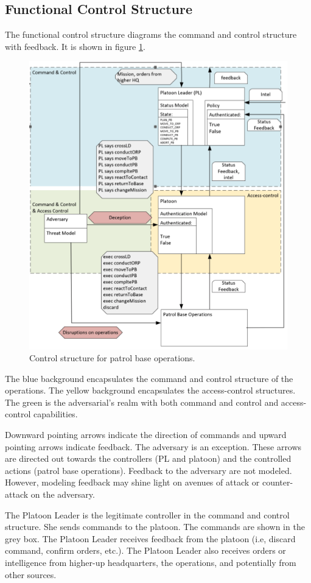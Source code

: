 \documentclass[../../main/main.tex]{subfiles}
\begin{document}
\subsection{Functional Control Structure}
The functional control structure diagrams the command and control structure with feedback.  It is shown in figure \ref{controlstr1}.
\begin{figure}[ht!]
\begin{center}
\includegraphics[width=0.7\linewidth]{../figures/controlstr1}
\caption{Control structure for patrol base operations.}
\label{controlstr1}
\end{center}
\end{figure}
 
The blue background encapsulates the command and control structure of the operations.  The yellow background encapsulates the access-control structures.  The green is the adversarial's realm with both command and control and access-control capabilities.  
 
Downward pointing arrows indicate the direction of commands and upward pointing arrows indicate feedback.  The adversary is an exception. These arrows are directed out towards the controllers (PL and platoon) and the controlled actions (patrol base operations).  Feedback to the adversary are not modeled.  However, modeling feedback may shine light on avenues of attack or counter-attack on the adversary.

The Platoon Leader is the legitimate controller in the command and control structure.  She sends commands to the platoon.  The commands are shown in the grey box.  The Platoon Leader receives feedback from the platoon (i.e, discard command, confirm orders, etc.).  The Platoon Leader also receives orders or intelligence from higher-up headquarters, the operations, and potentially from other sources. 
\end{document}
